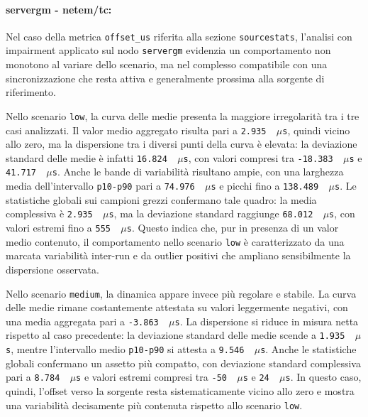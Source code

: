 \paragraph*{servergm - netem/tc:}
Nel caso della metrica \texttt{offset\_us} riferita alla sezione \texttt{sourcestats},
l'analisi con impairment applicato sul nodo \texttt{servergm} evidenzia un
comportamento non monotono al variare dello scenario, ma nel complesso compatibile
con una sincronizzazione che resta attiva e generalmente prossima alla sorgente di
riferimento.

Nello scenario \texttt{low}, la curva delle medie presenta la maggiore irregolarità
tra i tre casi analizzati. Il valor medio aggregato risulta pari a \texttt{2.935
\,$\mu$s}, quindi vicino allo zero, ma la dispersione tra i diversi punti della curva
è elevata: la deviazione standard delle medie è infatti \texttt{16.824 \,$\mu$s},
con valori compresi tra \texttt{-18.383 \,$\mu$s} e \texttt{41.717 \,$\mu$s}. Anche
le bande di variabilità risultano ampie, con una larghezza media dell'intervallo
\texttt{p10-p90} pari a \texttt{74.976 \,$\mu$s} e picchi fino a \texttt{138.489
\,$\mu$s}. Le statistiche globali sui campioni grezzi confermano tale quadro: la media
complessiva è \texttt{2.935 \,$\mu$s}, ma la deviazione standard raggiunge \texttt{68.012
\,$\mu$s}, con valori estremi fino a \texttt{555 \,$\mu$s}. Questo indica che,
pur in presenza di un valor medio contenuto, il comportamento nello scenario \texttt{low}
è caratterizzato da una marcata variabilità inter-run e da outlier positivi che
ampliano sensibilmente la dispersione osservata.

Nello scenario \texttt{medium}, la dinamica appare invece più regolare e stabile.
La curva delle medie rimane costantemente attestata su valori leggermente negativi,
con una media aggregata pari a \texttt{-3.863 \,$\mu$s}. La dispersione si
riduce in misura netta rispetto al caso precedente: la deviazione standard delle medie
scende a \texttt{1.935 \,$\mu$s}, mentre l'intervallo medio \texttt{p10-p90} si
attesta a \texttt{9.546 \,$\mu$s}. Anche le statistiche globali confermano un
assetto più compatto, con deviazione standard complessiva pari a \texttt{8.784
\,$\mu$s} e valori estremi compresi tra \texttt{-50 \,$\mu$s} e \texttt{24 \,$\mu$s}.
In questo caso, quindi, l'offset verso la sorgente resta sistematicamente vicino allo
zero e mostra una variabilità decisamente più contenuta rispetto allo scenario \texttt{low}.

